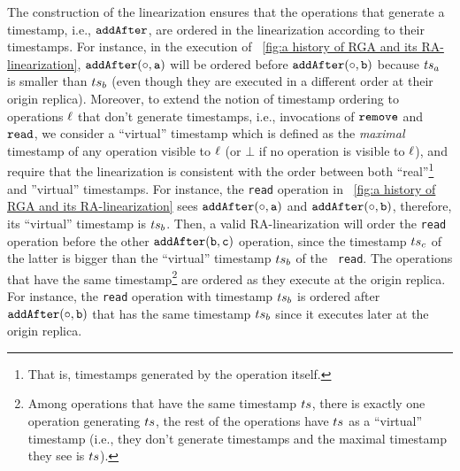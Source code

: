 The construction of the linearization ensures that the operations that
generate a timestamp, i.e., ${\tt addAfter}$, are ordered in the
linearization according to their timestamps. For instance, in the execution of \figureautorefname~\ref{fig:a history of RGA and its RA-linearization}, $\alabelshort[{\tt addAfter}]{\circ,a}$ will be ordered before $\alabelshort[{\tt addAfter}]{\circ,b}$ because $ts_a$ is smaller than $ts_b$ (even though they are executed in a different order at their origin replica). 
%
Moreover, to extend the notion of timestamp ordering to operations
$\ell$ that don't generate timestamps, i.e., invocations of ${\tt
  remove}$ and ${\tt read}$, we consider a ``virtual'' timestamp which
is defined as the \emph{maximal} timestamp of any operation visible to
$\ell$ (or $\bot$ if no operation is visible to $\ell$), and
require that the linearization is consistent with the order between
both ``real''\footnote{That is, timestamps generated by the operation
  itself.} and ''virtual'' timestamps. For instance, the {\tt read}
operation in \figureautorefname~\ref{fig:a history of RGA and its
  RA-linearization} sees $\alabelshort[{\tt addAfter}]{\circ,a}$ and
$\alabelshort[{\tt addAfter}]{\circ,b}$, therefore, its ``virtual''
timestamp is $ts_b$. Then, a valid RA-linearization will order the
{\tt read} operation before the other $\alabelshort[{\tt
  addAfter}]{b,c}$ operation, since the timestamp $ts_c$ of the
latter is bigger than the ``virtual'' timestamp $ts_b$ of the {\tt
  read}. The operations that have the same timestamp\footnote{Among
  operations that have the same timestamp $ts$, there is exactly one
  operation generating $ts$, the rest of the operations have $ts$ as a ``virtual'' timestamp (i.e., they don't generate timestamps and the maximal timestamp they see is $ts$).} are ordered as they execute at the origin replica. For instance, the {\tt read} operation with timestamp $ts_b$ is ordered after $\alabelshort[{\tt addAfter}]{\circ,b}$ that has the same timestamp $ts_b$ since it executes later at the origin replica.


